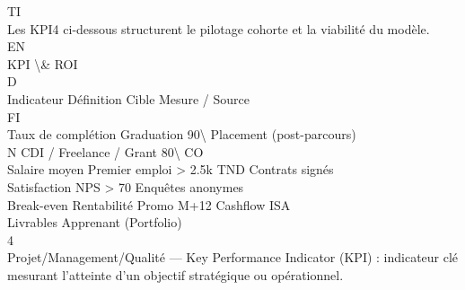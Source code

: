 \documentclass[12pt,landscape,a4paper]{article}
\begin{document}
\vspace{0.5em}
\vspace{0.5em}
\vspace{0.5em}
\vspace{0.5em}
TI\\
Les KPI4 ci-dessous structurent le pilotage cohorte et la viabilité du modèle.\\
\vspace{0.5em}
\vspace{0.5em}
\vspace{0.5em}
\vspace{0.5em}
EN\\
KPI \textbackslash{}& ROI\\
\vspace{0.5em}
\vspace{0.5em}
\vspace{0.5em}
\vspace{0.5em}
D\\
Indicateur                       Définition                     Cible            Mesure / Source\\
\vspace{0.5em}
\vspace{0.5em}
\vspace{0.5em}
\vspace{0.5em}
FI\\
Taux de complétion               Graduation                     90\textbackslash{}%
Placement (post-parcours)\\
N  CDI / Freelance / Grant        80\textbackslash{}%
CO\\
Salaire moyen                    Premier emploi                 \textgreater{} 2.5k TND       Contrats signés\\
Satisfaction                     NPS                            \textgreater{} 70             Enquêtes anonymes\\
Break-even                       Rentabilité Promo              M+12             Cashflow ISA\\
\vspace{0.5em}
\vspace{0.5em}
\vspace{0.5em}
Livrables Apprenant (Portfolio)\\
4\\
Projet/Management/Qualité — Key Performance Indicator (KPI) : indicateur clé mesurant l’atteinte d’un objectif stratégique ou opérationnel.\\
\end{document}
